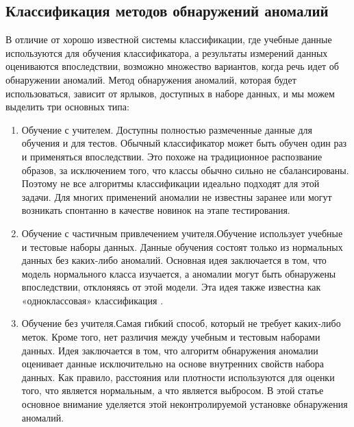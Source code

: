 \subsection{Классификация методов обнаружений аномалий}
В отличие от хорошо известной  системы классификации, где учебные данные используются для обучения классификатора, а результаты измерений данных оцениваются впоследствии, возможно множество вариантов, когда речь идет об обнаружении аномалий. Метод обнаружения аномалий, которая будет использоваться, зависит от ярлыков, доступных в наборе данных, и мы можем выделить три основных типа:
\begin{enumerate}
\item Обучение с учителем. Доступны полностью размеченные данные для обучения и для тестов. Обычный классификатор может быть обучен один раз и применяться впоследствии. Это похоже на традиционное распозвание образов, за исключением того, что классы обычно сильно не сбалансированы. Поэтому не все алгоритмы классификации идеально подходят для этой задачи. Для многих применений аномалии не известны заранее или могут возникать спонтанно в качестве новинок на этапе тестирования.
\item Обучение с частичным привлечением учителя.Обучение использует учебные и тестовые наборы данных. Данные обучения состоят только из нормальных данных без каких-либо аномалий. Основная идея заключается в том, что модель нормального класса изучается, а аномалии могут быть обнаружены впоследствии, отклоняясь от этой модели. Эта идея также известна как «одноклассовая» классификация \cite{Book03}.
\item Обучение без учителя.Самая гибкий способ, который не требует каких-либо меток. Кроме того, нет различия между учебным и тестовым наборами данных. Идея заключается в том, что алгоритм обнаружения аномалии оценивает данные исключительно на основе внутренних свойств набора данных. Как правило, расстояния или плотности используются для оценки того, что является нормальным, а что является выбросом. В этой статье основное внимание уделяется этой неконтролируемой установке обнаружения аномалий.

\end{enumerate}











